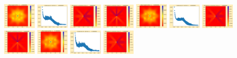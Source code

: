 \documentclass[11pt]{article}
\begin{document}
\includegraphics[width=0.11875\textwidth]{frame0049fig0.png}
\includegraphics[width=0.11875\textwidth]{frame0049fig1.png}
\includegraphics[width=0.11875\textwidth]{frame0049fig2.png}
\includegraphics[width=0.11875\textwidth]{frame0049fig3.png}
\vskip 10pt 
\includegraphics[width=0.11875\textwidth]{frame0050fig0.png}
\includegraphics[width=0.11875\textwidth]{frame0050fig1.png}
\includegraphics[width=0.11875\textwidth]{frame0050fig2.png}
\includegraphics[width=0.11875\textwidth]{frame0050fig3.png}
\includegraphics[width=0.11875\textwidth]{frame0051fig0.png}
\includegraphics[width=0.11875\textwidth]{frame0051fig1.png}
\includegraphics[width=0.11875\textwidth]{frame0051fig2.png}
\end{document}
